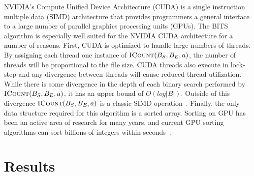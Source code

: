 \documentclass{bioinfo}
\begin{document}
NVIDIA's Compute Unified Device Architecture (CUDA) is a single instruction
multiple data (SIMD) architecture that provides programmers a general interface
to a large number of parallel graphics processing units (GPUs).  The BITS
algorithm is especially well suited for the NVIDIA CUDA architecture for a
number of reasons.  First, CUDA is optimized to handle large numbers of threads.
By assigning each thread one instance of $\textsc{ICount}(B_S,B_E,a)$, the
number of threads will be proportional to the file size.  CUDA threads also
execute in lock-step and any divergence between threads will cause reduced
thread utilization.  While there is some divergence in the depth of each binary
search performed by $\textsc{ICount}(B_S,B_E,a)$, it has an upper bound of
$O(log |B|)$.  Outside of this divergence $\textsc{ICount}(B_S,B_E,a)$ is a
classic SIMD operation~\citep{kirk2010}.  Finally, the only data structure
required for this algorithm is a sorted array.  Sorting on GPU has been an
active area of research for many years, and current GPU sorting algorithms can
sort billions of integers within seconds~\citep{merrill2011}.

\section{Results}

\end{document}
